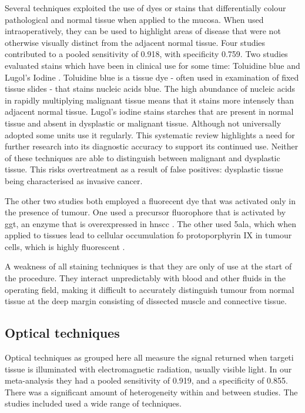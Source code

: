 Several techniques exploited the use of dyes or stains that differentially colour pathological and normal tissue when applied to the mucosa. 
When used intraoperatively, they can be used to highlight areas of disease that were not otherwise visually distinct from the adjacent normal tissue.
Four studies contributed to a pooled sensitivity of 0.918, with specificity 0.759.
Two studies evaluated stains which have been in clinical use for some time: Toluidine blue \cite{junaidm.ComparativeAnalysisToluidine2012} and Lugol's Iodine \cite{putriAceticAcidIodine2021}.
Toluidine blue is a tissue dye - often used in examination of fixed tissue slides - that stains nucleic acids blue.
The high abundance of nucleic acids in rapidly multiplying malignant tissue means that it stains more intensely than adjacent normal tissue.
Lugol's iodine stains starches that are present in normal tissue and absent in dysplastic or malignant tissue.
Although not universally adopted some units use it regularly. 
This systematic review highlights a need for further research into its diagnostic accuracy to support its continued use. %
Neither of these techniques are able to distinguish between malignant and dysplastic tissue. 
This risks overtreatment as a result of false positives: dysplastic tissue being characterised as invasive cancer.

The other two studies both employed a fluorecent dye that was activated only in the presence of tumour.
One used a precursor fluorophore that is activated by \gls{ggt}, an enzyme that is overexpressed in \gls{hnscc} \cite{slooterm.d.DetectingTumourpositiveResection2018}.
The other used \gls{5ala}, which when applied to tissues lead to cellular occumulation fo protoporphyrin IX in tumour cells, which is highly fluorescent \cite{leunigFluorescenceStainingOral2001}.

A weakness of all staining techniques is that they are only of use at the start of the procedure.
They interact unpredictably with blood and other fluids in the operating field, making it difficult to accurately distinguish tumour from normal tissue at the deep margin consisting of dissected muscle and connective tissue.

\subsection{Optical techniques}

Optical techniques as grouped here all measure the signal returned when targeti tissue is illuminated with electromagnetic radiation, usually visible light.
In our meta-analysis they had a pooled sensitivity of 0.919, and a specificity of 0.855.
There was a significant amount of heterogeneity within and between studies. 
The studies included used a wide range of techniques.

